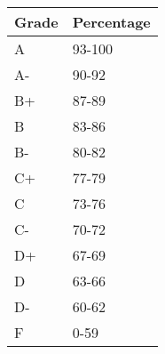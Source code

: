 \documentclass[10pt]{article}
\begin{document}
\clearpage
{ 
\bigskip
{}
\begin{table}[htp]
\begin{tabular}{ll}
Grade & Percentage \\
\hline
A & 93-100 \\
A- & 90-92 \\
B+ & 87-89 \\
B & 83-86 \\
B- & 80-82 \\
C+ & 77-79 \\
C & 73-76 \\
C- & 70-72 \\
D+ & 67-69 \\
D & 63-66 \\
D- & 60-62\\
F & 0-59 \\
\end{tabular}
\end{table}%
  }
  
\end{document}
